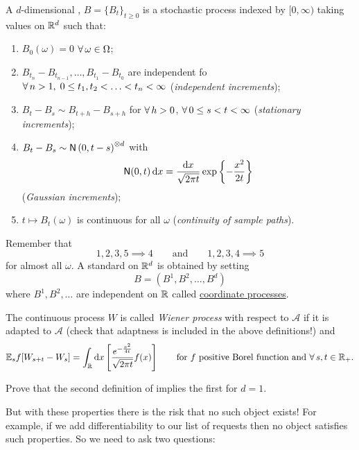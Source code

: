 \documentclass{report}
\begin{document}
\begin{definition}
	A $d$-dimensional \bwm, $B={\{B_{t}\}}_{t\geq 0}$ is a stochastic process indexed by $[0,\infty)$ taking values on $\mathbb{R}^{d}$ such that:
	\begin{enumerate}
		\item $B_{0}(\omega)=0$ \as{} $\forall\,\omega\in\Omega$;
		\item $B_{t_{n}}-B_{t_{n-1}},\ldots,B_{t_{1}}-B_{t_{0}}$ are independent fo $\forall\, n>1,\;0\leq t_{1},t_{2}<\ldots<t_{n}<\infty$ (\emph{independent increments});
		\item $B_{t}-B_{s}\sim B_{t+h}-B_{s+h}$ for $\forall\, h>0$, $\forall\, 0\leq s<t<\infty$ (\emph{stationary increments});
		\item $B_{t}-B_{s}\sim\mathsf{N}\left(0,t-s\right)^{\otimes d}$ with 
		\begin{equation*}
			\mathsf{N}(0,t)\mathop{}\!\mathrm{d} x =\frac{\mathop{}\!\mathrm{d} x}{\sqrt{2\pi t}}\exp\left\{-\frac{x^{2}}{2t}\right\}
		\end{equation*} (\emph{Gaussian increments});
		\item $t\mapsto B_{t}(\omega)$ is continuous for all $\omega$ (\emph{continuity of sample paths}).
	\end{enumerate}
\end{definition}
Remember that 
\begin{equation*}
	1,2,3,5\implies 4\qquad\text{and}\qquad1,2,3,4\implies 5
\end{equation*}
for almost all $\omega$. A standard \bwm{} on $\mathbb{R}^{d}$ is obtained by setting
\begin{equation*}
	B=(B^{1},B^{2},\ldots,B^{d})
\end{equation*}
where $B^{1},B^{2},\ldots$ are independent \bwm{} on $\mathbb{R}$ called \ul{coordinate processes}.
\begin{definition}
	The continuous process $W$ is called \emph{Wiener process} with respect to $\mathscr{A}$ if it is adapted to $\mathscr{A}$ (check that adaptness is included in the above definitions!) and 
	\begin{equation*}
		\mathbb{E}_{s}f[W_{s+t}-W_{s}]=\int_{\mathbb{R}}\mathop{}\!\mathrm{d} x\left[\frac{e^{-\frac{x^{2}}{4t}}}{\sqrt{2\pi t}}f(x)\right]\qquad\text{for $f$ positive Borel function and }\forall\, s,t\in\mathbb{R}_{+}.
	\end{equation*}
\end{definition}
\begin{exercise}
	Prove that the second definition of \bwm{} implies the first for $d=1$.
\end{exercise}
But with these properties there is the risk that no such object exists! For example, if we add differentiability to our list of requests then no object satisfies such properties. So we need to ask two questions:
\end{document}
